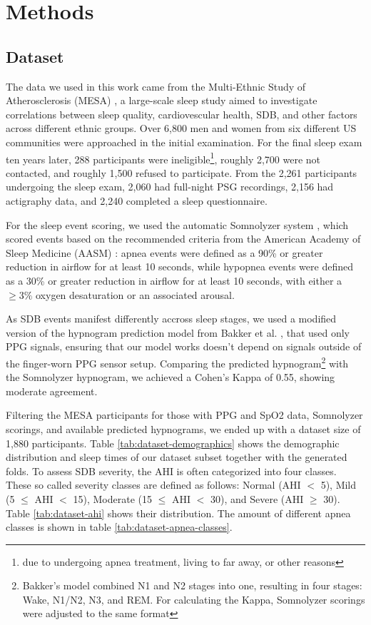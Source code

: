 \chapter{Methods \label{Chapter-Methods}}

\section{Dataset}

The data we used in this work came from the Multi-Ethnic Study of Atherosclerosis (MESA) \cite{chen2015racial}, a large-scale sleep study aimed to investigate correlations between sleep quality, cardiovescular health, SDB, and other factors across different ethnic groups.
Over 6,800 men and women from six different US communities were approached in the initial examination. For the final sleep exam ten years later, 288 participants were ineligible\footnote{due to undergoing apnea treatment, living to far away, or other reasons}, roughly 2,700 were not contacted, and roughly 1,500 refused to participate. From the 2,261 participants undergoing the sleep exam, 2,060 had full-night PSG recordings, 2,156 had actigraphy data, and 2,240 completed a sleep questionnaire.

For the sleep event scoring, we used the automatic Somnolyzer system , which scored events based on the recommended criteria from the American Academy of Sleep Medicine (AASM) : apnea events were defined as a 90\% or greater reduction in airflow for at least 10 seconds, while hypopnea events were defined as a 30\% or greater reduction in airflow for at least 10 seconds, with either a $\geq 3\%$ oxygen desaturation or an associated arousal. 

As SDB events manifest differently accross sleep stages, we used a modified version of the hypnogram prediction model from Bakker et al. \cite{bakker2021estimating}, that used only PPG signals, ensuring that our model works doesn't depend on signals outside of the finger-worn PPG sensor setup. Comparing the predicted hypnogram\footnote{Bakker's model combined N1 and N2 stages into one, resulting in four stages: Wake, N1/N2, N3, and REM. For calculating the Kappa, Somnolyzer scorings were adjusted to the same format} with the Somnolyzer hypnogram, we achieved a Cohen's Kappa of 0.55, showing moderate agreement.

Filtering the MESA participants for those with PPG and SpO2 data, Somnolyzer scorings, and available predicted hypnograms, we ended up with a dataset size of 1,880 participants. Table \ref{tab:dataset-demographics} shows the demographic distribution and sleep times of our dataset subset together with the generated folds.
To assess SDB severity, the AHI is often categorized into four classes. These so called severity classes are defined as follows: Normal (AHI $<$ 5), Mild (5 $\le$ AHI $<$ 15), Moderate (15 $\le$ AHI $<$ 30), and Severe (AHI $\ge$ 30).
Table \ref{tab:dataset-ahi} shows their distribution.
The amount of different apnea classes is shown in table \ref{tab:dataset-apnea-classes}.


